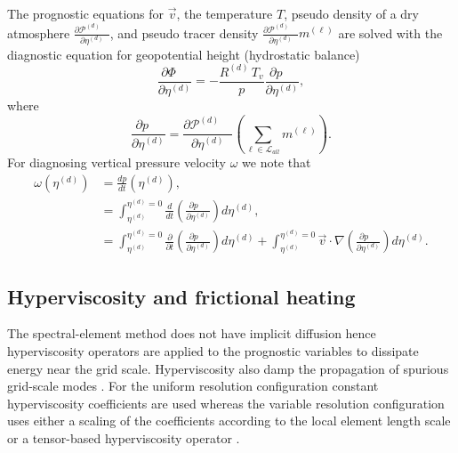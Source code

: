 \documentclass{agujournal}
\begin{document}
{The prognostic equations for $\vec{v}$, the temperature $T$, pseudo density of a dry atmosphere ${\frac{\partial {\mathcal{P}^{(d)}}\quad }{\partial \eta^{(d)}}}$, and pseudo tracer density ${\frac{\partial {\mathcal{P}^{(d)}}\quad }{\partial \eta^{(d)}}} m^{(\ell)}$ are solved with the diagnostic equation for geopotential height (hydrostatic balance)
\begin{equation}
\frac{\partial \Phi\quad }{\partial \eta^{(d)}}=-\frac{R^{(d)} \,T_v}{p}\frac{\partial p\quad }{\partial \eta^{(d)}},\label{eq:phi_1}
\end{equation}
where
\begin{equation}
\frac{\partial p\quad }{\partial \eta^{(d)}}=\frac{\partial \mathcal{P}^{(d)}\quad }{\partial \eta^{(d)}}\left( \sum_{\ell \in \mathcal{L}_{all}} m^{(\ell)}\right).
\end{equation}
For diagnosing vertical pressure velocity $\omega$ we note that
\begin{align}
\omega(\eta^{(d)})&=\frac{dp}{dt}(\eta^{(d)}),\\
      &=\int_{\eta^{(d)}}^{\eta^{(d)}=0}\frac{d}{dt}\left( \frac{\partial p\quad }{\partial \eta^{(d)}}\right)d\eta^{(d)},\\
      &=\int_{\eta^{(d)}}^{\eta^{(d)}=0}\frac{\partial}{\partial t}\left( \frac{\partial p\quad }{\partial \eta^{(d)}}\right)d\eta^{(d)}+\int_{\eta^{(d)}}^{\eta^{(d)}=0} \vec{v}\cdot \nabla \left( \frac{\partial p\quad }{\partial \eta^{(d)}}\right)d\eta^{(d)}.\label{eq:omega}
\end{align}
\subsection{Hyperviscosity and frictional heating}
The spectral-element method does not have implicit diffusion hence hyperviscosity operators are applied to the prognostic variables to dissipate energy near the grid scale. Hyperviscosity also damp the propagation of spurious grid-scale modes \citep{AW2009SIAM}. For the uniform resolution configuration constant hyperviscosity coefficients are used whereas the variable resolution configuration uses either a scaling of the coefficients according to the local element length scale \citep{ZJT2013} or a tensor-based hyperviscosity operator \citep{GetAl2014GMD}.
}
\end{document}
